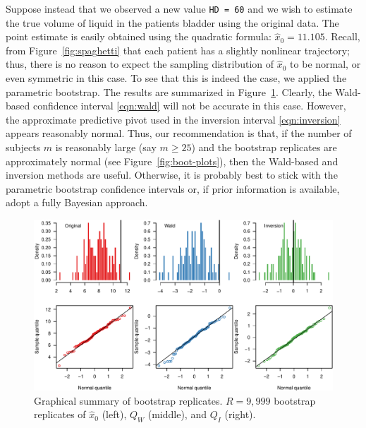 \documentclass{article}\usepackage[]{graphicx}\usepackage[]{color}
\newenvironment{knitrout}{}{} %
\begin{document}
Suppose instead that we observed a new value \texttt{HD = 60} and we wish to estimate the true volume of liquid in the patients bladder using the original data.  The point estimate is easily obtained using the quadratic formula: $\widehat{x}_0 = 11.105$.  Recall, from Figure~\ref{fig:spaghetti} that each patient has a slightly nonlinear trajectory; thus, there is no reason to expect the sampling distribution of $\widehat{x}_0$ to be normal, or even symmetric in this case.  To see that this is indeed the case, we applied the parametric bootstrap.  The results are summarized in Figure~\ref{fig:boot-plots-2}.  Clearly, the Wald-based confidence interval \eqref{eqn:wald} will not be accurate in this case.  However, the approximate predictive pivot used in the inversion interval \eqref{eqn:inversion} appears reasonably normal.  Thus, our recommendation is that, if the number of subjects $m$ is reasonably large (say $m \ge 25$) and the bootstrap replicates are approximately normal (see Figure~\ref{fig:boot-plots}), then the Wald-based and inversion methods are useful.  Otherwise, it is probably best to stick with the parametric bootstrap confidence intervals or, if prior information is available, adopt a fully Bayesian approach.
\begin{knitrout}
\color{fgcolor}\begin{figure}[!htb]
\includegraphics[width=\linewidth]{figure/boot-plots-2-1} \caption[Graphical summary of bootstrap replicates]{Graphical summary of bootstrap replicates. $R = 9,999$ bootstrap replicates of $\widehat{x}_0$ (left), $Q_W$ (middle), and $Q_I$ (right).}\label{fig:boot-plots-2}
\end{figure}


\end{knitrout}
\end{document}
